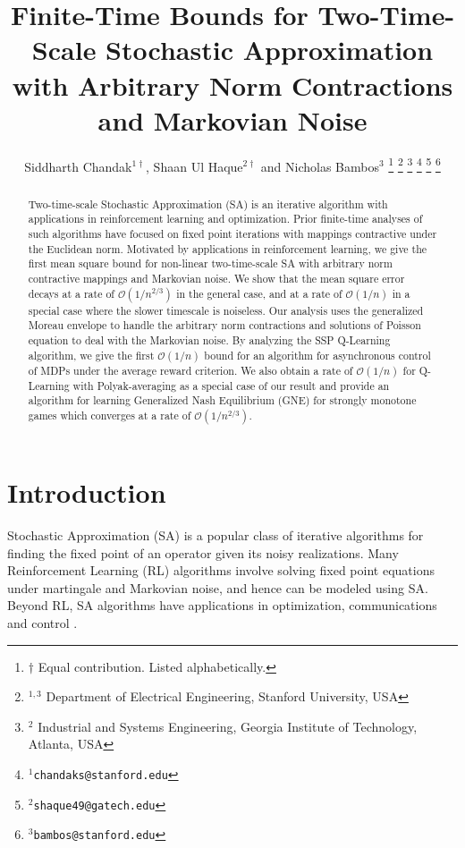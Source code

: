 \documentclass[letterpaper, 10 pt, conference]{ieeeconf}  %
\title{\LARGE \bf
Finite-Time Bounds for Two-Time-Scale Stochastic Approximation with Arbitrary Norm Contractions and Markovian Noise
}
\author{Siddharth Chandak$^{1\dagger}$, Shaan Ul Haque$^{2\dagger}$ and Nicholas Bambos$^{3}$%
\thanks{$\dagger$ Equal contribution. Listed alphabetically.}
\thanks{$^{1,3}$ Department of Electrical Engineering, Stanford University, USA}
\thanks{$^{2}$ {Industrial and Systems Engineering, Georgia Institute of Technology, Atlanta, USA}}
\thanks{$^{1}${\tt\small chandaks@stanford.edu}}
\thanks{$^{2}${\tt\small shaque49@gatech.edu}}
\thanks{$^{3}${\tt\small bambos@stanford.edu}}  
}
\theoremstyle{definition}
\theoremstyle{plain}
\begin{document}
\maketitle
\thispagestyle{empty}
\pagestyle{empty}


\begin{abstract}
Two-time-scale Stochastic Approximation (SA) is an iterative algorithm with applications in reinforcement learning and optimization. Prior finite-time analyses of such algorithms have focused on fixed point iterations with mappings contractive under the Euclidean norm. Motivated by applications in reinforcement learning, we give the first mean square bound for non-linear two-time-scale SA with arbitrary norm contractive mappings and Markovian noise. We show that the mean square error decays at a rate of $\mathcal{O}(1/n^{2/3})$ in the general case, and at a rate of $\mathcal{O}(1/n)$ in a special case where the slower timescale is noiseless. Our analysis uses the generalized Moreau envelope to handle the arbitrary norm contractions and solutions of Poisson equation to deal with the Markovian noise. By analyzing the SSP Q-Learning algorithm, we give the first $\mathcal{O}(1/n)$ bound for an algorithm for asynchronous control of MDPs under the average reward criterion. We also obtain a rate of $\mathcal{O}(1/n)$ for Q-Learning with Polyak-averaging as a special case of our result and provide an algorithm for learning Generalized Nash Equilibrium (GNE) for strongly monotone games which converges at a rate of $\mathcal{O}(1/n^{2/3})$.
\end{abstract}
\section{Introduction}
Stochastic Approximation (SA) is a popular class of iterative algorithms for finding the fixed point of an operator given its noisy realizations. Many Reinforcement Learning (RL) algorithms \cite{sutton2018} involve solving fixed point equations under martingale and Markovian noise, and hence can be modeled using SA. Beyond RL, SA algorithms have applications in optimization, communications and control \cite{Borkar-book}. 
\end{document}
